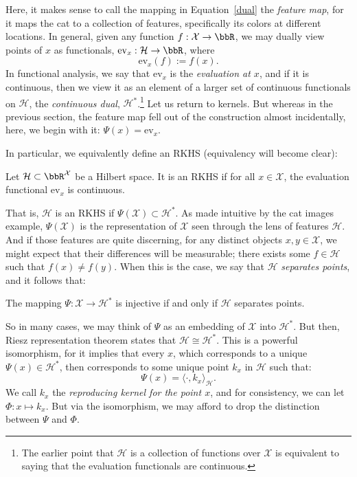 \documentclass[twoside,11pt]{homework}
\begin{document}
\begin{multicols}{2}
Here, it makes sense to call the mapping in Equation~\ref{dual} the \emph{feature map}, for it maps the cat to a collection of features, specifically its colors at different locations. In general, given any function $f : \mathcal{X} \to \bbR$, we may dually view points of $x$ as functionals, $\mathrm{ev}_x : \mathcal{H} \to \bbR$, where
\[\mathrm{ev}_x(f) := f(x).\]
In functional analysis, we say that $\mathrm{ev}_x$ is the \emph{evaluation at $x$}, and if it is continuous, then we view it as an element of a larger set of continuous functionals on $\mathcal{H}$, the \emph{continuous dual}, $\mathcal{H}^*$.\footnote{The earlier point that $\mathcal{H}$ is a collection of functions over $\mathcal{X}$ is equivalent to saying that the evaluation functionals are continuous.} Let us return to kernels. But whereas in the previous section, the feature map fell out of the construction almost incidentally, here, we begin with it: $\Psi(x) = \mathrm{ev}_x$.

In particular, we equivalently define an RKHS (equivalency will become clear):
\begin{definition}
Let $\mathcal{H} \subset \bbR^{\mathcal{X}}$ be a Hilbert space. It is an RKHS if for all $x \in \mathcal{X}$, the evaluation functional $\mathrm{ev}_x$ is continuous.
\end{definition}
That is, $\mathcal{H}$ is an RKHS if $\Psi(\mathcal{X}) \subset \mathcal{H}^*$. As made intuitive by the cat images example, $\Psi(\mathcal{X})$ is the representation of $\mathcal{X}$ seen through the lens of features $\mathcal{H}$. And if those features are quite discerning, for any distinct objects $x,y \in \mathcal{X}$, we might expect that their differences will be measurable; there exists some $f \in \mathcal{H}$ such that $f(x) \ne f(y)$. When this is the case, we say that $\mathcal{H}$ \emph{separates points}, and it follows that:
\begin{proposition}
  The mapping $\Psi : \mathcal{X} \to \mathcal{H}^*$ is injective if and only if $\mathcal{H}$ separates points.
\end{proposition}

So in many cases, we may think of $\Psi$ as an embedding of $\mathcal{X}$ into $\mathcal{H}^*$. But then, Riesz representation theorem states that $\mathcal{H} \cong \mathcal{H}^*$. This is a powerful isomorphism, for it implies that every $x$, which corresponds to a unique $\Psi(x) \in \mathcal{H}^*$, then corresponds to some unique point $k_x$ in $\mathcal{H}$ such that:
\[\Psi(x) = \langle \cdot, k_x\rangle_\mathcal{H}.\]
We call $k_x$ the \emph{reproducing kernel for the point $x$}, and for consistency, we can let $\Phi: x \mapsto k_x$. But via the isomorphism, we may afford to drop the distinction between $\Psi$ and $\Phi$.


\end{multicols}
\end{document}
